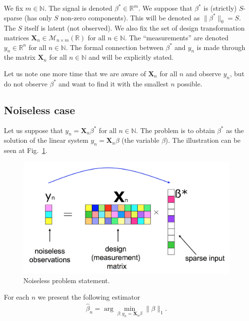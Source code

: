 \documentclass[11pt]{article}
\numberwithin{equation}{section}
\theoremstyle{definition}
\begin{document}
We fix $m \in \mathbb N$. The signal is denoted $\beta^* \in \mathbb R^m$.
We suppose that $\beta^*$ is (strictly) $S$-sparse (has only $S$ non-zero components).
This will be denoted as $\|\beta^*\|_0 = S$.
The $S$ itself is latent (not observed).
We also fix the set of design transformation matrices $\mathbf X_n \in \mathcal M_{n \times m}(\mathbb R)$ for all $n \in \mathbb N$.
The ``measurements'' are denoted $y_n \in \mathbb R^n$ for all $n \in \mathbb N$.
The formal connection between $\beta^*$ and $y_n$ is made through the matrix $\mathbf X_n$ for all $n \in \mathbb N$ and will be explicitly stated.

Let us note one more time that we are aware of $\mathbf X_n$ for all $n$ and observe $y_n$, but do not observe $\beta^*$ and want to find it with the smallest $n$ possible.

\subsection{Noiseless case}
Let us suppose that $y_n = \mathbf X_n \beta^*$ for all $n \in \mathbb N$.
The problem is to obtain $\beta^*$ as the solution of the linear system $y_n = \mathbf X_n \beta$ (the variable $\beta$).
The illustration can be seen at Fig.~\ref{fig:NoiseLessProblemStatement}.
\begin{figure}[H]
    \begin{center}
        \includegraphics[width=.75\textwidth]{figures/problem_statement_2.pdf}
    \end{center}
    \caption{
        \label{fig:NoiseLessProblemStatement}
        Noiseless problem statement.
    }
\end{figure}

For each $n$ we present the following estimator
\begin{gather}
    \label{eq:noiselessBeta}
    \hat \beta_n = \arg \min_{\beta: y_n = \mathbf X_n \beta} \|\beta\|_1.
\end{gather}
\end{document}
